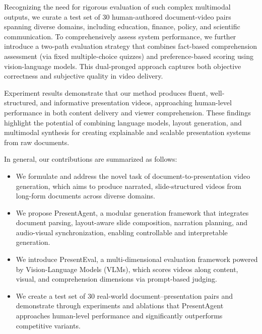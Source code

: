 \documentclass[11pt]{article}
\begin{document}
Recognizing the need for rigorous evaluation of such complex multimodal outputs, we curate a test set of 30 human-authored document-video pairs spanning diverse domains, including education, finance, policy, and scientific communication. To comprehensively assess system performance, we further introduce a two-path evaluation strategy that combines fact-based comprehension assessment (via fixed multiple-choice quizzes) and preference-based scoring using vision-language models. This dual-pronged approach captures both objective correctness and subjective quality in video delivery.

Experiment results demonstrate that our method produces fluent, well-structured, and informative presentation videos, approaching human-level performance in both content delivery and viewer comprehension. These findings highlight the potential of combining language models, layout generation, and multimodal synthesis for creating explainable and scalable presentation systems from raw documents.


In general, our contributions are summarized as follows:
\begin{itemize}[leftmargin=*,itemsep=2pt]
    \item We formulate and address the novel task of document-to-presentation video generation, which aims to produce narrated, slide-structured videos from long-form documents across diverse domains.

    \item We propose PresentAgent, a modular generation framework that integrates document parsing, layout-aware slide composition, narration planning, and audio-visual synchronization, enabling controllable and interpretable generation.

    \item We introduce PresentEval, a multi-dimensional evaluation framework powered by Vision-Language Models (VLMs), which scores videos along content, visual, and comprehension dimensions via prompt-based judging.

    \item We create a test set of 30 real-world document–presentation pairs and demonstrate through experiments and ablations that PresentAgent approaches human-level performance and significantly outperforms competitive variants.
\end{itemize}
\end{document}
